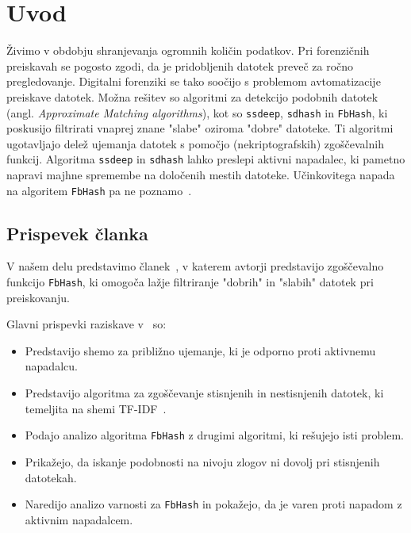 \documentclass{acm_proc_article-sp}
\begin{document}


\section{Uvod}
Živimo v obdobju shranjevanja ogromnih količin podatkov. Pri forenzičnih preiskavah se pogosto zgodi, da je pridobljenih datotek preveč za ročno pregledovanje. Digitalni forenziki se tako soočijo s problemom avtomatizacije preiskave datotek. Možna rešitev so algoritmi za detekcijo podobnih datotek (angl. \emph{Approximate Matching algorithms}), kot so \texttt{ssdeep}, \texttt{sdhash} in \texttt{FbHash}, ki poskusijo filtrirati vnaprej znane "slabe" oziroma "dobre" datoteke. Ti algoritmi ugotavljajo delež ujemanja datotek s pomočjo (nekriptografskih) zgoščevalnih funkcij. Algoritma \texttt{ssdeep} in \texttt{sdhash} lahko preslepi aktivni napadalec, ki pametno napravi majhne spremembe na določenih mestih datoteke. Učinkovitega napada na algoritem \texttt{FbHash} pa ne poznamo~\cite{fbhash}.
\\
\subsection{Prispevek \v{c}lanka}

V našem delu predstavimo članek~\cite{fbhash}, v katerem avtorji predstavijo zgoščevalno funkcijo \texttt{FbHash}, ki omogoča lažje filtriranje "dobrih" in "slabih" datotek pri preiskovanju. 

Glavni prispevki raziskave v~\cite{fbhash} so:
\begin{itemize}
  \item Predstavijo shemo za približno ujemanje, ki je odporno proti aktivnemu napadalcu.
  \item Predstavijo algoritma za zgoščevanje stisnjenih in nestisnjenih datotek, ki temeljita na shemi TF-IDF~\cite{Ramos_usingtf-idf}.
  \item Podajo analizo algoritma \texttt{FbHash} z drugimi algoritmi, ki rešujejo isti problem.
  \item Prikažejo, da iskanje podobnosti na nivoju zlogov ni dovolj pri stisnjenih datotekah.
  \item Naredijo analizo varnosti za \texttt{FbHash} in pokažejo, da je varen proti napadom z aktivnim napadalcem.
\end{itemize}
\end{document}
